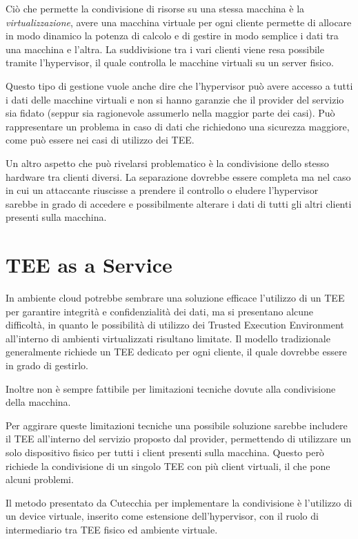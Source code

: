 \documentclass[12pt,italian]{report}
\begin{document}
	Ciò che permette la condivisione di risorse su una stessa macchina è la \textit{virtualizzazione}, avere una macchina virtuale per ogni cliente permette di allocare in modo dinamico la potenza di calcolo e di gestire in modo semplice i dati tra una macchina e l'altra. La suddivisione tra i vari clienti viene resa possibile tramite l'hypervisor, il quale controlla le macchine virtuali su un server fisico.
	
	Questo tipo di gestione vuole anche dire che l'hypervisor può avere accesso a tutti i dati delle macchine virtuali e non si hanno garanzie che il provider del servizio sia fidato (seppur sia ragionevole assumerlo nella maggior parte dei casi). Può rappresentare un problema in caso di dati che richiedono una sicurezza maggiore, come può essere nei casi di utilizzo dei TEE.
	
	Un altro aspetto che può rivelarsi problematico è la condivisione dello stesso hardware tra clienti diversi. La separazione dovrebbe essere completa ma nel caso in cui un attaccante riuscisse a prendere il controllo o eludere l'hypervisor sarebbe in grado di accedere e possibilmente alterare i dati di tutti gli altri clienti presenti sulla macchina.
	
	\section{TEE as a Service}
	\label{sec:taas}
	In ambiente cloud potrebbe sembrare una soluzione efficace l'utilizzo di un TEE per garantire integrità e confidenzialità dei dati, ma si presentano alcune difficoltà, in quanto le possibilità di utilizzo dei Trusted Execution Environment all'interno di ambienti virtualizzati risultano limitate. Il modello tradizionale generalmente richiede un TEE dedicato per ogni cliente, il quale dovrebbe essere in grado di gestirlo.
	
	Inoltre non è sempre fattibile per limitazioni tecniche dovute alla condivisione della macchina.
	
	\bigbreak

	Per aggirare queste limitazioni tecniche una possibile soluzione sarebbe includere il TEE all'interno del servizio proposto dal provider, permettendo di utilizzare un solo dispositivo fisico per tutti i client presenti sulla macchina. Questo però richiede la condivisione di un singolo TEE con più client virtuali, il che pone alcuni problemi.

	Il metodo presentato da Cutecchia \cite{tesi_cutecchia} per implementare la condivisione è l'utilizzo di un device virtuale, inserito come estensione dell'hypervisor, con il ruolo di intermediario tra TEE fisico ed ambiente virtuale. 
	
\end{document}
